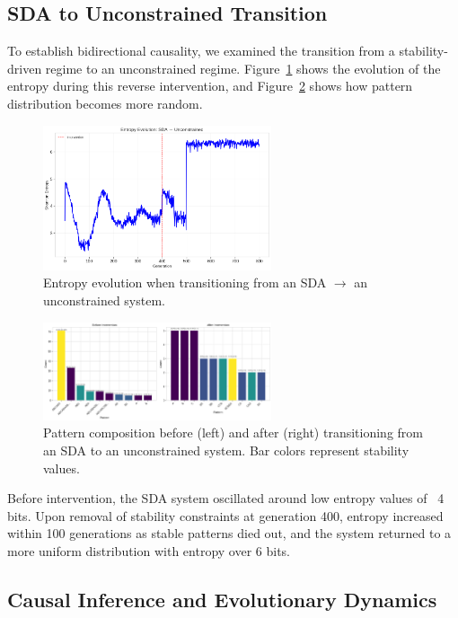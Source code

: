 \documentclass[preprint,12pt]{elsarticle}
\begin{document}
\subsection{SDA to Unconstrained Transition}

To establish bidirectional causality, we examined the transition from a stability-driven regime to an unconstrained regime. Figure~\ref{fig:s2u-entropy} shows the evolution of the entropy during this reverse intervention, and Figure~\ref{fig:s2u-patterns} shows how pattern distribution becomes more random.

\begin{figure}[h]
    \centering
    \includegraphics[width=0.6\textwidth]{figure_8.png}
    \caption{Entropy evolution when transitioning from an SDA $\to$ an unconstrained system.}
    \label{fig:s2u-entropy}
\end{figure}

\begin{figure}[h]
    \centering
    \includegraphics[width=0.6\textwidth]{figure_9.png}
    \caption{Pattern composition before (left) and after (right) transitioning from an SDA to an unconstrained system. Bar colors represent stability values.}
    \label{fig:s2u-patterns}
\end{figure}

Before intervention, the SDA system oscillated around low entropy values of ~4 bits. Upon removal of stability constraints at generation 400, entropy increased within 100 generations as stable patterns died out, and the system returned to a more uniform distribution with entropy over 6 bits.

\subsection{Causal Inference and Evolutionary Dynamics}
\end{document}

